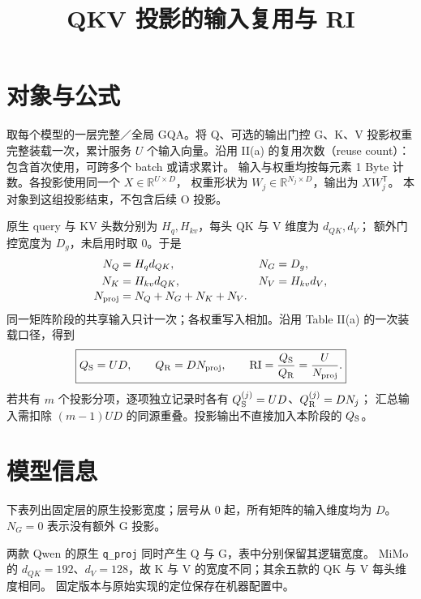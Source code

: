 
\renewcommand{\WorkloadName}{QKV 投影}
\title{\bfseries\WorkloadName 的输入复用与 RI}

\maketitle

\section{对象与公式}
取每个模型的一层完整／全局 GQA。将 Q、可选的输出门控 G、K、V
投影权重完整装载一次，累计服务 $U$ 个输入向量。沿用 II(a) 的复用次数（reuse count）：包含首次使用，可跨多个 batch 或请求累计。
输入与权重均按每元素 1 Byte 计数。各投影使用同一个 $X\in\mathbb R^{U\times D}$，
权重形状为 $W_j\in\mathbb R^{N_j\times D}$，输出为 $XW_j^{\mathsf T}$。
本对象到这组投影结束，不包含后续 O 投影。

原生 query 与 KV 头数分别为 $H_q,H_{kv}$，每头 QK 与 V 维度为 $d_{QK},d_V$；
额外门控宽度为 $D_g$，未启用时取 0。于是
\[
\begin{aligned}
N_Q&=H_qd_{QK}, & N_G&=D_g,\\
N_K&=H_{kv}d_{QK}, & N_V&=H_{kv}d_V,\\[-2pt]
N_{\rm proj}&=N_Q+N_G+N_K+N_V.&&
\end{aligned}
\]
同一矩阵阶段的共享输入只计一次；各权重写入相加。沿用 Table II(a) 的一次装载口径，得到
\[
\boxed{\displaystyle
Q_{\mathrm S}=UD,\qquad Q_{\mathrm R}=DN_{\rm proj},\qquad
\mathrm{RI}=\frac{Q_{\mathrm S}}{Q_{\mathrm R}}=\frac{U}{N_{\rm proj}}.}
\]
若共有 $m$ 个投影分项，逐项独立记录时各有 $Q_{\mathrm S}^{(j)}=UD$、$Q_{\mathrm R}^{(j)}=DN_j$；
汇总输入需扣除 $(m-1)UD$ 的同源重叠。投影输出不直接加入本阶段的 $Q_{\mathrm S}$。

\section{模型信息}
下表列出固定层的原生投影宽度；层号从 0 起，所有矩阵的输入维度均为 $D$。
$N_G=0$ 表示没有额外 G 投影。
\begin{center}\small\end{center}
两款 Qwen 的原生 \texttt{q\_proj} 同时产生 Q 与 G，表中分别保留其逻辑宽度。
MiMo 的 $d_{QK}=192$、$d_V=128$，故 K 与 V 的宽度不同；其余五款的 QK 与 V 每头维度相同。
固定版本与原始实现的定位保存在机器配置中。

\newpage
